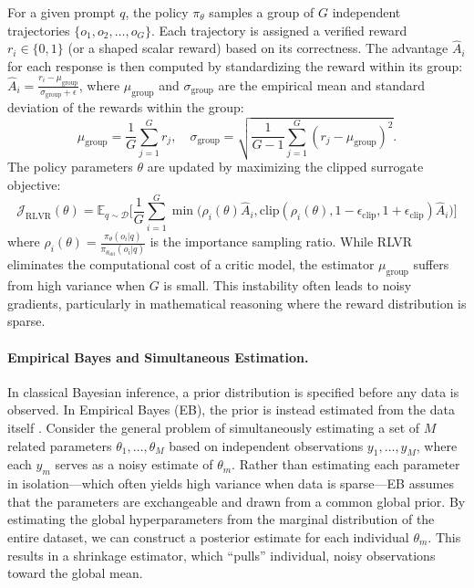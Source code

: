\documentclass{article}
\theoremstyle{plain}
\theoremstyle{definition}
\theoremstyle{remark}
\begin{document}
For a given prompt $q$, the policy $\pi_\theta$ samples a group of $G$ independent trajectories $\{o_1, o_2, \dots, o_G\}$. Each trajectory is assigned a verified reward $r_i \in \{0, 1\}$ (or a shaped scalar reward) based on its correctness. The advantage $\hat{A}_i$ for each response is then computed by standardizing the reward within its group: $\hat{A}_i = \frac{r_i - \mu_{\text{group}}}{\sigma_{\text{group}} + \epsilon}$,
where $\mu_{\text{group}}$ and $\sigma_{\text{group}}$ are the empirical mean and standard deviation of the rewards within the group:
\begin{equation*}
    \mu_{\text{group}} = \frac{1}{G} \sum_{j=1}^G r_j, \quad \sigma_{\text{group}} = \sqrt{\frac{1}{G-1} \sum_{j=1}^G (r_j - \mu_{\text{group}})^2}.
\end{equation*}
The policy parameters $\theta$ are updated by maximizing the clipped surrogate objective:
\begin{equation}
    \mathcal{J}_{\text{RLVR}}(\theta) = \mathbb{E}_{q \sim \mathcal{D}} \bigg[ \frac{1}{G} \sum_{i=1}^G \min \Big( \rho_i(\theta) \hat{A}_i, \text{clip}(\rho_i(\theta), 1-\epsilon_{\text{clip}}, 1+\epsilon_{\text{clip}}) \hat{A}_i \Big) \bigg]
\end{equation}
where $\rho_i(\theta) = \frac{\pi_\theta(o_i|q)}{\pi_{\theta_{\text{old}}}(o_i|q)}$ is the importance sampling ratio. While RLVR eliminates the computational cost of a critic model, the estimator $\mu_{\text{group}}$ suffers from high variance when $G$ is small. This instability often leads to noisy gradients, particularly in mathematical reasoning where the reward distribution is sparse.

\paragraph{Empirical Bayes and Simultaneous Estimation.}
In classical Bayesian inference, a prior distribution is specified before any data is observed. In Empirical Bayes (EB), the prior is instead estimated from the data itself \citep{robbins1992empirical}. Consider the general problem of simultaneously estimating a set of $M$ related parameters $\theta_1, \dots, \theta_M$ based on independent observations $y_1, \dots, y_M$, where each $y_m$ serves as a noisy estimate of $\theta_m$. Rather than estimating each parameter in isolation---which often yields high variance when data is sparse---EB assumes that the parameters are exchangeable and drawn from a common global prior. By estimating the global hyperparameters from the marginal distribution of the entire dataset, we can construct a posterior estimate for each individual $\theta_m$. This results in a shrinkage estimator, which ``pulls'' individual, noisy observations toward the global mean.
\end{document}

